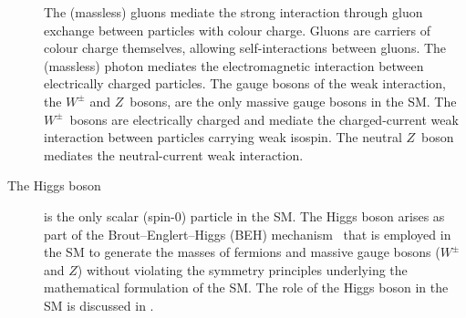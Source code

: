 \begin{description}
  The (massless) gluons mediate the strong interaction through gluon exchange
  between particles with colour charge. Gluons are carriers of colour charge
  themselves, allowing self-interactions between gluons. The (massless) photon
  mediates the electromagnetic interaction between electrically charged
  particles. The gauge bosons of the weak interaction, the $W^\pm$ and
  $Z$~bosons, are the only massive gauge bosons in the SM. The $W^\pm$~bosons
  are electrically charged and mediate the charged-current weak interaction
  between particles carrying weak isospin. The neutral $Z$~boson mediates the
  neutral-current weak interaction.

\item[The Higgs boson] is the only scalar (spin-$0$) particle in the SM. The
  Higgs boson arises as part of the Brout--Englert--Higgs (BEH)
  mechanism~\cite{Englert:1964et,Higgs:1964pj} that is employed in the SM to
  generate the masses of fermions and massive gauge bosons ($W^\pm$ and $Z$)
  without violating the symmetry principles underlying the mathematical
  formulation of the SM. The role of the Higgs boson in the SM is discussed in
  .

\end{description}

